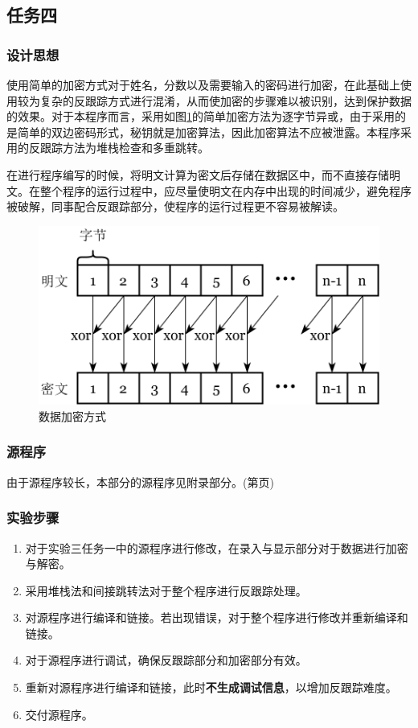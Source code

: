 \documentclass{article}
\begin{document}
	\subsection{任务四}
	\subsubsection{设计思想}
	使用简单的加密方式对于姓名，分数以及需要输入的密码进行加密，在此基础上使用较为复杂的反跟踪方式进行混淆，从而使加密的步骤难以被识别，达到保护数据的效果。对于本程序而言，采用如图\ref{fig:encrypt}的简单加密方法为逐字节异或，由于采用的是简单的双边密码形式，秘钥就是加密算法，因此加密算法不应被泄露。本程序采用的反跟踪方法为堆栈检查和多重跳转。\par
	在进行程序编写的时候，将明文计算为密文后存储在数据区中，而不直接存储明文。在整个程序的运行过程中，应尽量使明文在内存中出现的时间减少，避免程序被破解，同事配合反跟踪部分，使程序的运行过程更不容易被解读。
	\begin{figure}[H]
		\centering
		\includegraphics[width=0.8\linewidth]{res/homework_4/encrypt.png}
		\caption{数据加密方式}
		\label{fig:encrypt}
	\end{figure}

	\subsubsection{源程序}
	由于源程序较长，本部分的源程序见附录部分。(第\pageref{code:4_4}页)

	\subsubsection{实验步骤}
	\begin{enumerate}
		\item 对于实验三任务一中的源程序进行修改，在录入与显示部分对于数据进行加密与解密。
		\item 采用堆栈法和间接跳转法对于整个程序进行反跟踪处理。
		\item 对源程序进行编译和链接。若出现错误，对于整个程序进行修改并重新编译和链接。
		\item 对于源程序进行调试，确保反跟踪部分和加密部分有效。
		\item 重新对源程序进行编译和链接，此时\textbf{不生成调试信息}，以增加反跟踪难度。
		\item 交付源程序。
	\end{enumerate}
\end{document}
